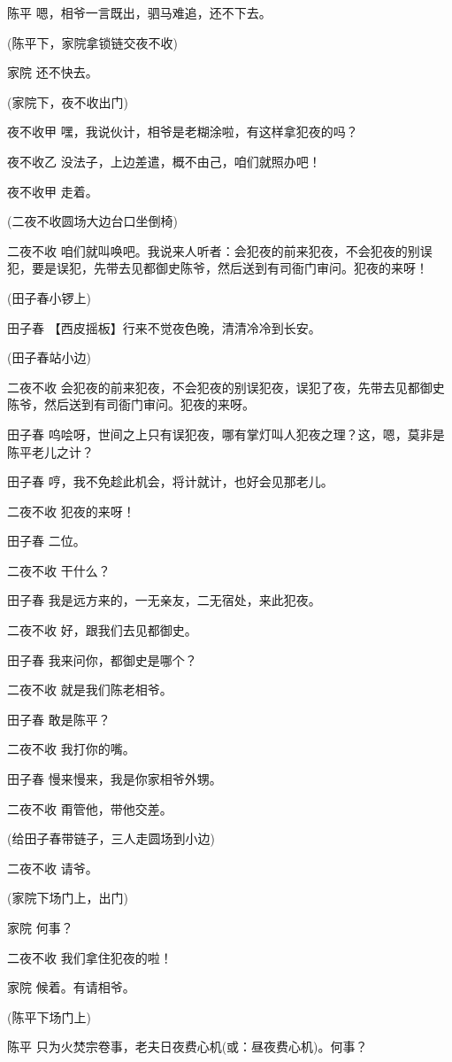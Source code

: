 陈平 嗯，相爷一言既出，驷马难追，还不下去。

(陈平下，家院拿锁链交夜不收)

家院 还不快去。

(家院下，夜不收出门)

夜不收甲 嘿，我说伙计，相爷是老糊涂啦，有这样拿犯夜的吗？

夜不收乙 没法子，上边差遣，概不由己，咱们就照办吧！

夜不收甲 走着。

(二夜不收圆场大边台口坐倒椅)

二夜不收
咱们就叫唤吧。我说来人听者：会犯夜的前来犯夜，不会犯夜的别误犯，要是误犯，先带去见都御史陈爷，然后送到有司衙门审问。犯夜的来呀！

(田子春小锣上)

田子春 【西皮摇板】行来不觉夜色晚，清清冷冷到长安。

(田子春站小边)

二夜不收
会犯夜的前来犯夜，不会犯夜的别误犯夜，误犯了夜，先带去见都御史陈爷，然后送到有司衙门审问。犯夜的来呀。

田子春
呜哙呀，世间之上只有误犯夜，哪有掌灯叫人犯夜之理？这，嗯，莫非是陈平老儿之计？

田子春 哼，我不免趁此机会，将计就计，也好会见那老儿。

二夜不收 犯夜的来呀！

田子春 二位。

二夜不收 干什么？

田子春 我是远方来的，一无亲友，二无宿处，来此犯夜。

二夜不收 好，跟我们去见都御史。

田子春 我来问你，都御史是哪个？

二夜不收 就是我们陈老相爷。

田子春 敢是陈平？

二夜不收 我打你的嘴。

田子春 慢来慢来，我是你家相爷外甥。

二夜不收 甭管他，带他交差。

(给田子春带链子，三人走圆场到小边)

二夜不收 请爷。

(家院下场门上，出门)

家院 何事？

二夜不收 我们拿住犯夜的啦！

家院 候着。有请相爷。

(陈平下场门上)

陈平 只为火焚宗卷事，老夫日夜费心机(或：昼夜费心机)。何事？

